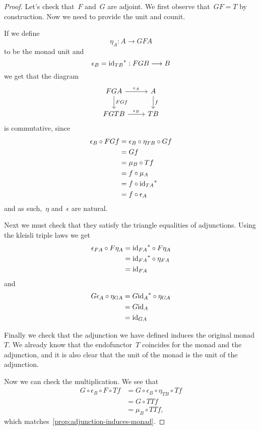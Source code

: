 \documentclass[../TFG.tex]{subfiles}
\begin{document}
\begin{proof}
    Let's check that~\(F\) and~\(G\) are adjoint. We first observe
    that~\(GF=T\) by construction. Now we need to provide the unit and
    counit.

    If we define
    \[
        \eta_{A} : A \longrightarrow GF A
    \]
    to be the monad unit and
    \[
        \epsilon_{B} = {\mathrm{id}_{TB}}^{\ast} : FG B \longrightarrow B
    \]
    we get that the diagram
    \[\begin{tikzcd}
        FGA \ar[r, "\epsilon_{A}"] \ar[d, "FG f"] & A \ar[d, "f"] \\
        FGTB \ar[r, "\epsilon_{B}"] & TB
    \end{tikzcd}\]
    is commutative, since
    \begin{align*}
        \epsilon_{B} \circ FGf
            &= \epsilon_{B} \circ \eta_{TB} \circ Gf \\
            &= Gf \\
            &= \mu_{B} \circ Tf \\
            &= f \circ \mu_{A} \\
            &= f \circ {\mathrm{id}_{TA}}^{\ast} \\
            &= f \circ \epsilon_{A}
    \end{align*}
    and as such,~\(\eta\) and~\(\epsilon\) are natural.

    Next we must check that they satisfy the triangle equalities of adjunctions.
    Using the kleisli triple laws we get
    \begin{align*}
        \epsilon_{FA} \circ F\eta_{A}
            &= {\mathrm{id}_{FA}}^{\ast} \circ F\eta_{A} \\
            &= {\mathrm{id}_{FA}}^{\ast} \circ \eta_{FA} \\
            &= \mathrm{id}_{FA}
    \end{align*}
    and
    \begin{align*}
        G\epsilon_{A} \circ \eta_{GA}
            &= G{\mathrm{id}_{A}}^{\ast} \circ \eta_{GA} \\
            &= G\mathrm{id}_{A} \\
            &= \mathrm{id}_{GA}
    \end{align*}

    Finally we check that the adjunction we have defined induces the original
    monad~\(T\). We already know that the endofunctor~\(T\) coincides for the
    monad and the adjunction, and it is also clear that the unit of the monad is
    the unit of the adjunction.

    Now we can check the multiplication. We see that
    \begin{align*}
        G \circ \epsilon_{B} \circ F \circ Tf
            &= G \circ \epsilon_{B} \circ \eta_{TB} \circ Tf \\
            &= G \circ TTf \\
            &= \mu_{B} \circ TTf,
    \end{align*}
    which matches~\ref{prop:adjunction-induces-monad}.
\end{proof}
\end{document}
